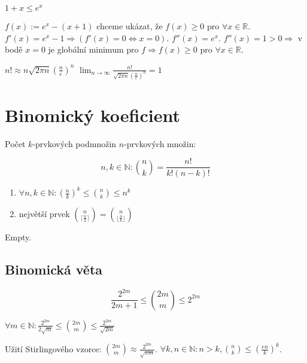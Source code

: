 \begin{lemma}
	$1+x \leq e^x$
\end{lemma}

\begin{dukaz}
	$f(x) := e^x - (x+1)$ chceme ukázat, že $f(x) \geq 0$ pro $\forall x \in \mathbb{R}$. $f'(x) = e^x - 1 \Rightarrow (f'(x) = 0 \Leftrightarrow x = 0)$. $f''(x) = e^x$. $f''(x) = 1 > 0 \Rightarrow$ v bodě $x = 0$ je globální minimum pro $f \Rightarrow f(x) \geq 0$ pro $\forall x \in \mathbb{R}$.
\end{dukaz}

\begin{veta}
	$n! \approx n \sqrt{2\pi n} (\frac{n}{e})^n$ $\lim_{n \to \infty} \frac{n!}{\sqrt{2\pi n}(\frac{n}{e})^n} = 1$
\end{veta}

\section{Binomický koeficient}

Počet $k$-prvkových podmnožin $n$-prvkových množin: 

$$
n,k \in \mathbb{N}: \binom{n}{k}=\frac{n!}{k!(n-k)!}
$$

\begin{pozor}
	\begin{enumerate}
		\item $\forall n,k \in \mathbb{N}: (\frac{n}{k})^k \leq \binom{n}{k} \leq n^k$
		\item největší prvek $\binom{n}{\lceil \frac{n}{2} \rceil} = \binom{n}{\lfloor \frac{n}{k} \rfloor}$
	\end{enumerate}	
\end{pozor}

\begin{dukaz}
	Empty.
\end{dukaz}

\subsection{Binomická věta}

$$
\frac{2^{2m}}{2m+1} \leq \binom{2m}{m} \leq 2^{2m}
$$

\begin{veta}
	$\forall m \in \mathbb{N}: \frac{2^{2m}}{2\sqrt{m}} \leq \binom{2m}{m} \leq \frac{2^{2m}}{\sqrt{2m}}$
\end{veta}

Užití Stirlingového vzorce: $\binom{2m}{m} \approx \frac{2^{2m}}{\sqrt{\pi m}}$. $\forall k,n \in \mathbb{N}: n > k, \binom{n}{k} \leq (\frac{en}{k})^k$.

